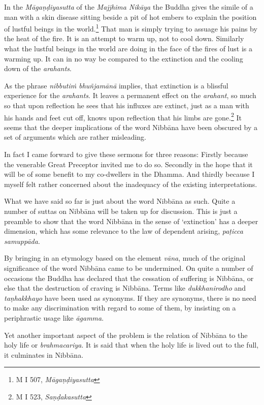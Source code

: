 In the \emph{Māgaṇḍiyasutta} of the \emph{Majjhima Nikāya} the Buddha gives the simile of a man with a skin disease sitting beside a pit of hot embers to explain the position of lustful beings in the world.\footnote{M I 507, \emph{Māgaṇḍiyasutta}} That man is simply trying to assuage his pains by the heat of the fire. It is an attempt to warm up, not to cool down. Similarly what the lustful beings in the world are doing in the face of the fires of lust is a warming up. It can in no way be compared to the extinction and the cooling down of the \emph{arahants}.

As the phrase \emph{nibbutiṁ bhuñjamānā} implies, that extinction is a blissful experience for the \emph{arahants}. It leaves a permanent effect on the \emph{arahant}, so much so that upon reflection he sees that his influxes are extinct, just as a man with his hands and feet cut off, knows upon reflection that his limbs are gone.\footnote{M I 523, \emph{Saṇḍakasutta}} It seems that the deeper implications of the word Nibbāna have been obscured by a set of arguments which are rather misleading.

In fact I came forward to give these sermons for three reasons: Firstly because the venerable Great Preceptor invited me to do so. Secondly in the hope that it will be of some benefit to my co-dwellers in the Dhamma. And thirdly because I myself felt rather concerned about the inadequacy of the existing interpretations.

What we have said so far is just about the word Nibbāna as such. Quite a number of suttas on Nibbāna will be taken up for discussion. This is just a preamble to show that the word Nibbāna in the sense of `extinction' has a deeper dimension, which has some relevance to the law of dependent arising, \emph{paṭicca samuppāda}.

By bringing in an etymology based on the element \emph{vāna}, much of the original significance of the word Nibbāna came to be undermined. On quite a number of occasions the Buddha has declared that the cessation of suffering is Nibbāna, or else that the destruction of craving is Nibbāna. Terms like \emph{dukkhanirodho} and \emph{taṇhakkhayo} have been used as synonyms. If they are synonyms, there is no need to make any discrimination with regard to some of them, by insisting on a periphrastic usage like \emph{āgamma}.

Yet another important aspect of the problem is the relation of Nibbāna to the holy life or \emph{brahmacariya}. It is said that when the holy life is lived out to the full, it culminates in Nibbāna.

